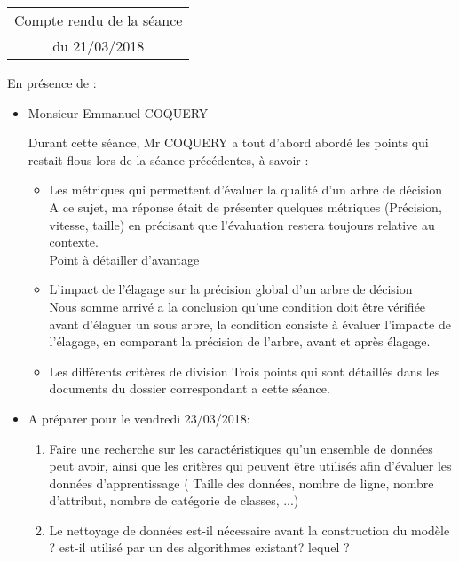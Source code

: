 \documentclass[a4paper, 11pt]{report}
\begin{document}
 
\begin{center}
\begin{tabular}{|c|}
\hline
Compte rendu de la séance \\du 21\//03\//2018\\
\hline

\end{tabular}
\end{center}


En présence de :\\
\begin{itemize}
\item Monsieur Emmanuel COQUERY

Durant cette séance, Mr COQUERY a tout d'abord abordé les points qui restait flous lors de la séance précédentes, à savoir : 
\begin{itemize}
\item Les métriques qui permettent d'évaluer la qualité d'un arbre de décision\\
A ce sujet, ma réponse était de présenter quelques métriques (Précision, vitesse, taille) en précisant que l'évaluation restera toujours relative au contexte.\\
Point à détailler d'avantage
\item L'impact de l'élagage sur la précision global d'un arbre de décision\\
Nous somme arrivé a la conclusion qu'une condition doit être vérifiée avant d'élaguer un sous arbre, la condition consiste à évaluer l'impacte de l'élagage, en comparant la précision de l'arbre, avant et après élagage.
\item Les différents critères de division
Trois points qui sont détaillés dans les documents du dossier correspondant a cette séance.
\end{itemize}

\item A préparer pour le vendredi 23/03/2018:\\
\begin{enumerate}
\item Faire une recherche sur les caractéristiques qu'un ensemble de données peut avoir, ainsi que les critères qui peuvent être utilisés afin d'évaluer les données d'apprentissage ( Taille des données, nombre de ligne, nombre d'attribut, nombre de catégorie de classes, ...)

\item Le nettoyage de données est-il nécessaire avant la construction du modèle ? est-il utilisé par un des algorithmes existant? lequel ? 

\end{enumerate}

\end{itemize}
\end{document}
